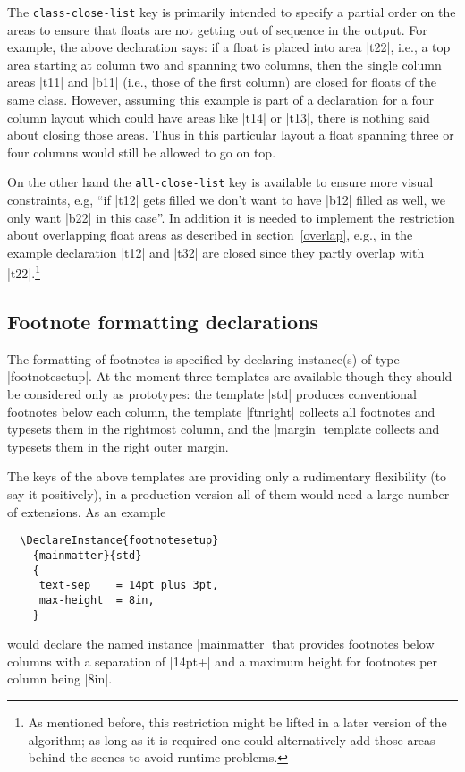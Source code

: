 \documentclass[twocolumn]{article}
\begin{document}
The \texttt{class-close-list} key is primarily intended to specify a
partial order on the areas to ensure that floats are not getting out
of sequence in the output. For example, the above declaration says: if
a float is placed into area |t22|, i.e., a top area starting at column
two and spanning two columns, then the single column areas |t11| and
|b11| (i.e., those of the first column) are closed for floats of the
same class. However, assuming this example is part of a declaration for
a four column layout which could have areas like |t14| or |t13|, there
is nothing said about closing those areas. Thus in this particular
layout a float spanning three or four columns would still be allowed
to go on top.

On the other hand the \texttt{all-close-list} key is available to
ensure more visual constraints, e.g, ``if |t12| gets filled we don't
want to have |b12| filled as well, we only want |b22| in this
case''. In addition it is needed to implement the restriction about
overlapping float areas as described in section~\vref{overlap}, e.g.,
in the example declaration |t12| and |t32| are closed since they
partly overlap with |t22|.\footnote{As mentioned before, this
restriction might be lifted in a later version of the algorithm; as
long as it is required one could alternatively add those areas behind
the scenes to avoid runtime problems.}





\subsection{Footnote formatting declarations}

The formatting of footnotes is specified by declaring instance(s) of
type |footnotesetup|. At the moment three templates are available
though they should be considered only as prototypes: the template
|std| produces conventional footnotes below each column, the template
|ftnright| collects all footnotes and typesets them in the rightmost
column, and the |margin| template collects and typesets them in the
right outer margin.

The keys of the above templates are providing only a rudimentary
flexibility (to say it positively), in a production version all of
them would need a large number of extensions.
As an example
\begin{verbatim}
  \DeclareInstance{footnotesetup}
    {mainmatter}{std}
    {
     text-sep    = 14pt plus 3pt,
     max-height  = 8in,
    }
\end{verbatim}
would declare the named instance |mainmatter| that provides footnotes
below columns with a separation of |14pt+| and a maximum height for
footnotes per column being |8in|.
\end{document}

